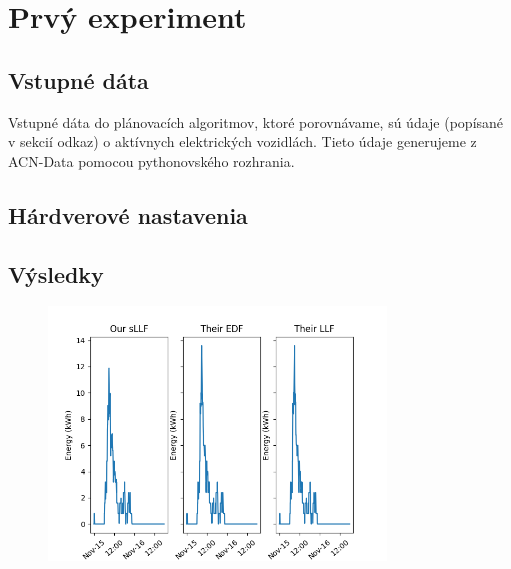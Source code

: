 






\section{Prvý experiment}


\subsection{Vstupné dáta}
Vstupné dáta do plánovacích algoritmov, ktoré porovnávame, sú údaje (popísané v sekcií odkaz) o aktívnych elektrických vozidlách. Tieto údaje generujeme z ACN-Data pomocou pythonovského rozhrania.





\subsection{Hárdverové nastavenia}





\subsection{Výsledky}

\begin{figure}[H]
    \includegraphics[width=0.8\textwidth]{images/experiments/plot-sLLF-comparison.png}
    \centering
    \caption[Porovnanie ]{}
    \label{acndata:obr}
\end{figure}


